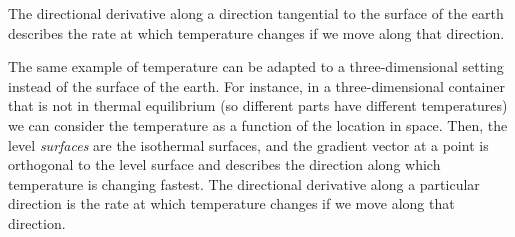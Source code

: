 \documentclass[10pt]{amsart}
\begin{document}
The directional derivative along a direction tangential to the surface
of the earth describes the rate at which temperature changes if we
move along that direction.

The same example of temperature can be adapted to a three-dimensional
setting instead of the surface of the earth. For instance, in a
three-dimensional container that is not in thermal equilibrium (so
different parts have different temperatures) we can consider the
temperature as a function of the location in space. Then, the level
{\em surfaces} are the isothermal surfaces, and the gradient vector at
a point is orthogonal to the level surface and describes the direction
along which temperature is changing fastest. The directional
derivative along a particular direction is the rate at which
temperature changes if we move along that direction.
\end{document}
